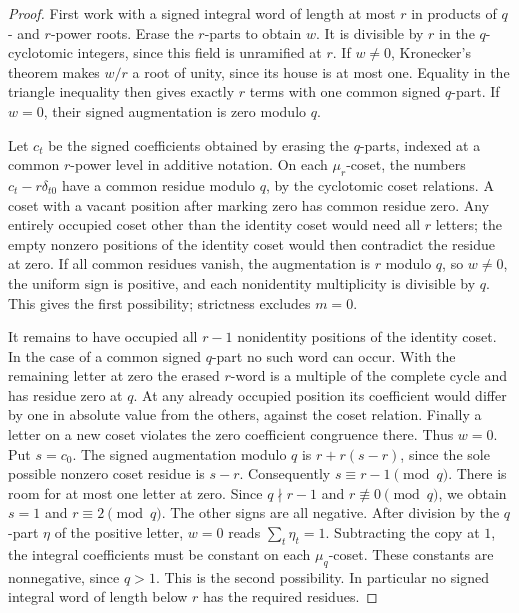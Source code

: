 \documentclass[11pt,a4paper]{article}
\numberwithin{equation}{section}
\theoremstyle{remark}
\begin{document}
\begin{proof}
First work with a signed integral word of length at most $r$ in products
of $q$- and $r$-power roots. Erase the $r$-parts to obtain $w$.
It is divisible by $r$ in the $q$-cyclotomic integers, since this
field is unramified at $r$. If $w\ne0$, Kronecker's theorem makes
$w/r$ a root of unity, since its house is at most one. Equality in the
triangle inequality then gives exactly $r$ terms with one common
signed $q$-part. If $w=0$, their signed augmentation is zero modulo
$q$.

Let $c_t$ be the signed coefficients obtained by erasing the
$q$-parts, indexed at a common $r$-power level in additive notation.
On each $\mu_r$-coset, the numbers $c_t-r\delta_{t0}$ have a common
residue modulo $q$, by the cyclotomic coset relations.
A coset with a vacant position after marking zero has common residue
zero. Any entirely occupied coset other than the identity coset
would need all $r$ letters; the empty nonzero positions of the
identity coset would then contradict the residue at zero.
If all common residues vanish, the augmentation is $r$ modulo $q$,
so $w\ne0$, the uniform sign is positive, and each nonidentity
multiplicity is divisible by $q$. This gives the first possibility;
strictness excludes $m=0$.

It remains to have occupied all $r-1$ nonidentity positions of the
identity coset. In the case of a common signed $q$-part no such word
can occur. With the remaining letter at zero the erased $r$-word is
a multiple of the complete cycle and has residue zero at $q$. At any
already occupied position its coefficient would differ by one in
absolute value from the others, against the coset relation. Finally a
letter on a new coset violates the zero coefficient congruence there.
Thus $w=0$. Put $s=c_0$. The signed augmentation modulo $q$ is
$r+r(s-r)$, since the sole possible nonzero coset residue is $s-r$.
Consequently $s\equiv r-1\pmod q$. There is room for at most one letter
at zero. Since $q\nmid r-1$ and $r\not\equiv0\pmod q$, we obtain
$s=1$ and $r\equiv2\pmod q$. The other signs are all negative.
After division by the $q$-part $\eta$ of the positive
letter, $w=0$ reads $\sum_t\eta_t=1$. Subtracting the copy at $1$,
the integral coefficients must be constant on each $\mu_q$-coset.
These constants are nonnegative, since $q>1$. This is the second
possibility. In particular no signed integral word of length below
$r$ has the required residues.


\end{proof}
\end{document}
